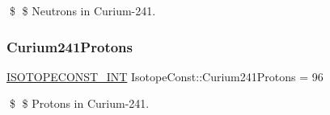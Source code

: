 \$ \$ Neutrons in Curium-\/241. \mbox{\label{group___isotope_const-_curium-_cm241_gaf6973110c80fd516fa2355cd50f2858f}} 
\subsubsection{\texorpdfstring{Curium241\+Protons}{Curium241Protons}}
{\footnotesize\ttfamily \mbox{\hyperlink{group___isotope_const-_macros_ga5f18360b3e99483a35c32d789e62621c}{I\+S\+O\+T\+O\+P\+E\+C\+O\+N\+S\+T\+\_\+\+I\+NT}} Isotope\+Const\+::\+Curium241\+Protons = 96}

\$ \$ Protons in Curium-\/241. 